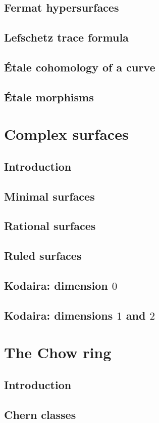 \documentclass [11 pt, oneside, margin = 1 in] {article}
\begin{document}
\subsection{Fermat hypersurfaces}
\subsection{Lefschetz trace formula}
\subsection{\'Etale cohomology of a curve}
\subsection{\'Etale morphisms}

\section{Complex surfaces}
\subsection{Introduction}
\subsection{Minimal surfaces}
\subsection{Rational surfaces}
\subsection{Ruled surfaces}
\subsection{Kodaira: dimension $0$}
\subsection{Kodaira: dimensions $1$ and $2$}


\section{The Chow ring}
\subsection{Introduction}
\subsection{Chern classes}

\printindex
\end{document}

